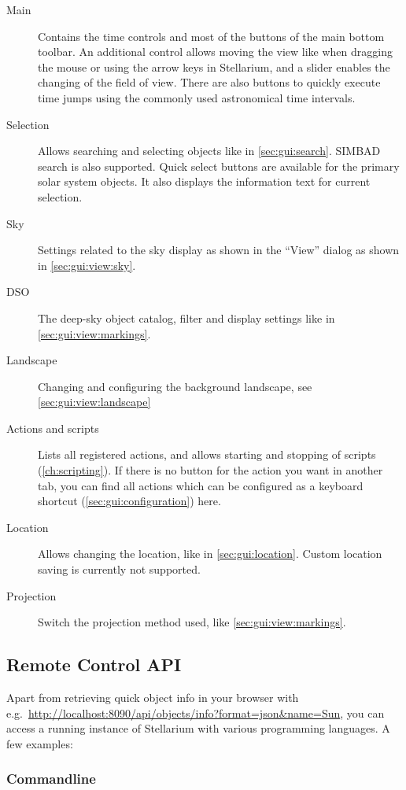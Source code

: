 \begin{description}
\item[Main] Contains the time controls and most of the buttons of the 
main bottom toolbar. An additional control allows moving the view like when 
dragging the mouse or using the arrow keys in Stellarium, and a slider enables 
the changing of the field of view. There are also buttons to quickly execute 
time jumps using the commonly used astronomical time intervals.
\item[Selection] Allows searching and selecting objects like in \autoref{sec:gui:search}. 
SIMBAD search is also supported. Quick select buttons are available for the 
primary solar system objects. It also displays the information text for current 
selection.
\item[Sky] Settings related to the sky display as shown in the ``View'' dialog 
as shown in \autoref{sec:gui:view:sky}.
\item[DSO] The deep-sky object catalog, filter and display settings like in 
\autoref{sec:gui:view:markings}.
\item[Landscape] Changing and configuring the background landscape, see 
\autoref{sec:gui:view:landscape}
\item[Actions and scripts] Lists all registered actions, and allows starting 
and stopping of scripts (\autoref{ch:scripting}). If there is no button for the 
action you want in another tab, you can find all actions which can be 
configured as a keyboard shortcut (\autoref{sec:gui:configuration}) here.
\item[Location] Allows changing the location, like in 
\autoref{sec:gui:location}. Custom location saving is currently not 
supported.
\item[Projection] Switch the projection method used, like \autoref{sec:gui:view:markings}.
\end{description}

\subsection{Remote Control API}
\label{sec:plugins:RemoteControl:API}

Apart from retrieving quick object info in your browser with e.g.\ \url{http://localhost:8090/api/objects/info?format=json&name=Sun},
you can access a running instance of Stellarium with various programming languages. A few examples:

\subsubsection{Commandline}
\label{sec:plugins:RemoteControl:API:CLI}

